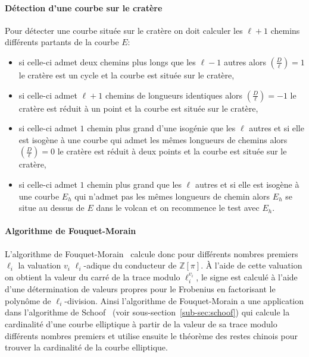 \documentclass[10pt,a4paper]{book}
\theoremstyle{plain}
\theoremstyle{definition}
\theoremstyle{definition}
\theoremstyle{definition}
\theoremstyle{definition}
\theoremstyle{definition}
\theoremstyle{remark}
\theoremstyle{remark}
\theoremstyle{definition}
\begin{document}
\paragraph{Détection d'une courbe sur le cratère}
Pour détecter une courbe située sur le cratère on doit calculer les $\ell+1$ chemins différents partants de la courbe $E$:
\begin{itemize}
\item si celle-ci admet deux chemins plus longs que les $\ell-1$ autres alors 
$\left( \frac{D}{\ell} \right) = 1$ le cratère est un cycle et la courbe est
située sur le cratère,
\item si celle-ci admet $\ell+1$ chemins de longueurs identiques alors $\left( 
\frac{D}{\ell} \right) = -1$ le cratère est réduit à un point et la courbe est
située sur le cratère,
\item si celle-ci admet $1$ chemin plus grand d'une isogénie que les $\ell$ 
autres et si elle est isogène à une courbe qui admet les mêmes longueurs de 
chemins alors $\left( \frac{D}{\ell} \right) = 0$ le cratère est réduit à deux 
points et la courbe est située sur le cratère,
\item si celle-ci admet $1$ chemin plus grand que les $\ell$ autres et si elle 
est isogène à une courbe $E_h$ qui n'admet pas les mêmes longueurs de chemin 
alors $E_h$ se situe au dessus de $E$ dans le volcan et on recommence le test 
avec $E_h$.
\end{itemize}

\paragraph{Algorithme de Fouquet-Morain}
L'algorithme de Fouquet-Morain~\cite{FouquetMorain02} calcule donc pour 
différents nombres premiers $\ell_i$ la valuation $v_i$ $\ell_i$-adique du 
conducteur de $\mathbb{Z}[\pi]$. \`A l'aide de cette valuation on obtient la 
valeur du carré de la trace modulo $\ell_i^{v_i}$, le signe est calculé à 
l'aide d'une détermination de valeurs propres pour le Frobenius en factorisant 
le polynôme de $\ell_i$-division. Ainsi l'algorithme de Fouquet-Morain a une 
application dans l'algorithme de Schoof~\cite{Schoof85} (voir 
sous-section~\ref{sub-sec:schoof}) qui calcule la cardinalité d'une courbe
elliptique à partir de la valeur de sa trace modulo différents nombres premiers
et utilise ensuite le théorème des restes chinois pour trouver la cardinalité 
de la courbe elliptique. 
\end{document}
